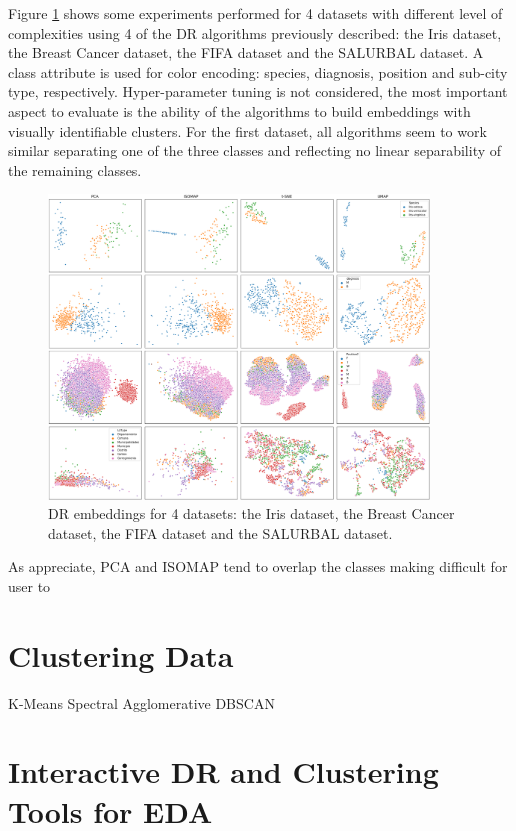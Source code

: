 Figure \ref{fig:dr-matrix} shows some experiments performed for 4 datasets with different level of complexities using 4 of the DR algorithms previously described: the Iris dataset, the Breast Cancer dataset, the FIFA dataset and the SALURBAL dataset. A class attribute is used for color encoding: species, diagnosis, position and sub-city type, respectively. Hyper-parameter tuning is not considered, the most important aspect to evaluate is the ability of the algorithms to build embeddings with visually identifiable clusters. For the first dataset, all algorithms seem to work similar separating one of the three classes and reflecting no linear separability of the remaining classes.

\begin{figure}[ht]
 \centering
 \includegraphics[width=0.9\textwidth]{dr-matrix.png}
 \caption{DR embeddings for 4 datasets: the Iris dataset, the Breast Cancer dataset, the FIFA dataset and the SALURBAL dataset.}
 \label{fig:dr-matrix}
\end{figure}

As appreciate, PCA and ISOMAP tend to overlap the classes making difficult for user to   

\section{Clustering Data}
\label{section3.2}

K-Means
Spectral
Agglomerative
DBSCAN

\section{Interactive DR and Clustering Tools for EDA}
\label{section3.3}

